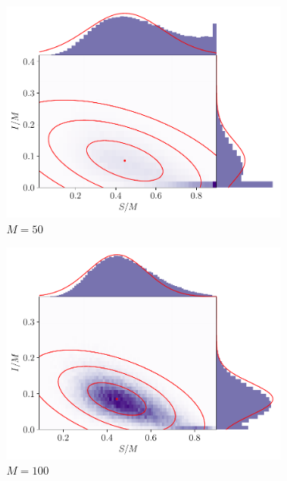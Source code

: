 \begin{figure}
	\begin{center}
		\begin{subfigure}{0.49\textwidth}
			\includegraphics[width=\textwidth]{chp07_outlook/figures/sir/sir_pairwise_50}
			\caption{\(M = 50\)}
			\label{fig:sir_gauss_rels_1}
		\end{subfigure}
		\begin{subfigure}{0.49\textwidth}
			\includegraphics[width=\textwidth]{chp07_outlook/figures/sir/sir_pairwise_100}
			\caption{\(M = 100\)}
			\label{fig:sir_gauss_rels_2}
		\end{subfigure}
		\begin{subfigure}{0.49\textwidth}

\end{subfigure}
\end{center}
\end{figure}
